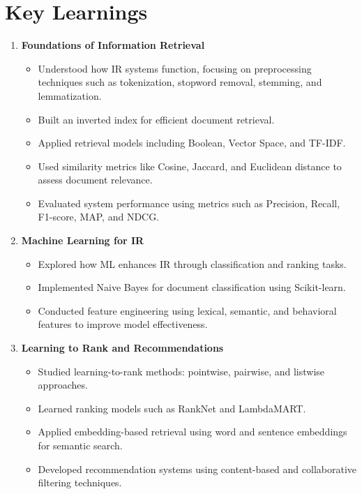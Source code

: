 \documentclass[12pt,a4paper]{report}
\begin{document}
\newpage
\section{Key Learnings}
\begin{enumerate}
    \item \textbf{Foundations of Information Retrieval}
    \begin{itemize}
        \item Understood how IR systems function, focusing on preprocessing techniques such as tokenization, stopword removal, stemming, and lemmatization.
        \item Built an inverted index for efficient document retrieval.
        \item Applied retrieval models including Boolean, Vector Space, and TF-IDF.
        \item Used similarity metrics like Cosine, Jaccard, and Euclidean distance to assess document relevance.
        \item Evaluated system performance using metrics such as Precision, Recall, F1-score, MAP, and NDCG.
    \end{itemize}
    
    \item \textbf{Machine Learning for IR}
    \begin{itemize}
        \item Explored how ML enhances IR through classification and ranking tasks.
        \item Implemented Naive Bayes for document classification using Scikit-learn.
        \item Conducted feature engineering using lexical, semantic, and behavioral features to improve model effectiveness.
    \end{itemize}
    
    \item \textbf{Learning to Rank and Recommendations}
    \begin{itemize}
        \item Studied learning-to-rank methods: pointwise, pairwise, and listwise approaches.
        \item Learned ranking models such as RankNet and LambdaMART.
        \item Applied embedding-based retrieval using word and sentence embeddings for semantic search.
        \item Developed recommendation systems using content-based and collaborative filtering techniques.
    \end{itemize}
    

\end{enumerate}
\end{document}
